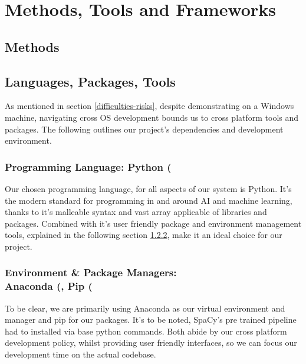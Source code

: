 \documentclass[11pt]{article}
\begin{document}
\section{Methods, Tools and Frameworks} \label{methods-tools-frameworks}


\subsection{Methods} \label{methods}

   



            

\subsection{Languages, Packages, Tools} \label{languages-packages-tools}

As mentioned in section \ref{difficulties-risks}, despite demonstrating on a Windows \cite{windows} machine, navigating cross OS development bounds us to cross platform tools and packages. The following outlines our project's dependencies and development environment.

\subsubsection{Programming Language: Python (\texorpdfstring{\cite{python}})} \label{programming-language}
Our chosen programming language, for all aspects of our system is Python. It's the modern standard for programming in and around AI and machine learning, thanks to it's malleable syntax and vast array applicable of libraries and packages. Combined with it's user friendly package and environment management tools, explained in the following section \ref{environment-package-manager}, make it an ideal choice for our project.

\subsubsection{Environment \& Package Managers: \texorpdfstring{ \\ }{} Anaconda (\texorpdfstring{\cite{anaconda}}),  Pip (\texorpdfstring{\cite{pip}})} \label{environment-package-manager}
To be clear, we are primarily using Anaconda as our virtual environment and manager and pip for our packages. It's to be noted, SpaCy's pre trained pipeline had to installed via base python commands. Both abide by our cross platform development policy, whilst providing user friendly interfaces, so we can focus our development time on the actual codebase.
\end{document}
